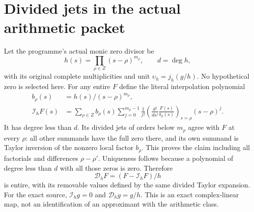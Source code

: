 \documentclass[11pt]{article}
\begin{document}
\section{Divided jets in the actual arithmetic packet}
Let the programme's actual monic zero divisor be
\[
 h(s)=\prod_{\rho\in Z}(s-\rho)^{m_\rho},\qquad d=\deg h,
\]
with its original complete multiplicities and unit
$\upsilon_h=j_h(g/h)$. No hypothetical zero is selected here.
For any entire $F$ define the literal interpolation polynomial
\begin{equation}\tag{PT13}
 \begin{split}
 b_\rho(s)&=h(s)/(s-\rho)^{m_\rho},\\
 \mathcal I_hF(s)&=\sum_{\rho\in Z}b_\rho(s)
   \sum_{j=0}^{m_\rho-1}\frac{1}{j!}
     \left(\frac{d^j}{ds^j}\frac{F(s)}{b_\rho(s)}\right)_{s=\rho}
                      (s-\rho)^j.
 \end{split}
\end{equation}
It has degree less than $d$. Its divided jets of orders below
$m_\rho$ agree with $F$ at every $\rho$: all other summands
have the full zero there, and its own summand is Taylor inversion
of the nonzero local factor $b_\rho$. This proves the claim
including all factorials and differences $\rho-\rho'$.
Uniqueness follows because a polynomial of degree less than $d$
with all those zeros is zero. Therefore
\begin{equation}\tag{PT14}
 \mathcal D_hF=(F-\mathcal I_hF)/h
\end{equation}
is entire, with its removable values defined by the same divided
Taylor expansion. For the exact source, $\mathcal I_hg=0$
and $\mathcal D_hg=g/h$. This is an exact complex-linear map,
not an identification of an approximant with the arithmetic class.
\end{document}
